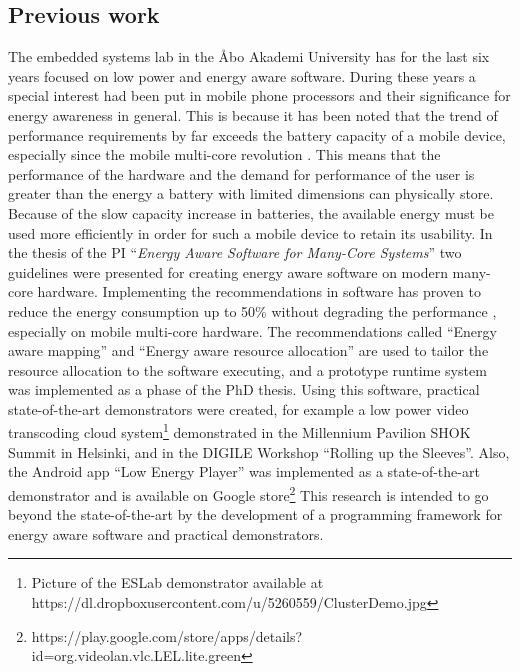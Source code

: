 \documentclass{article}
\begin{document}
\subsection{Previous work}
The embedded systems lab in the \AA{}bo Akademi University has for the last six years focused on low power and energy aware software. 
During these years a special interest had been put in mobile phone processors and their significance for energy awareness in general. 
This is because it has been noted that the trend of performance requirements by far exceeds the battery capacity of a mobile device, especially since the mobile multi-core revolution \cite{BatteryCapacity,CPUCapacity}. 
This means that the performance of the hardware and the demand for performance of the user is greater than the energy a battery with limited dimensions can physically store. 
Because of the slow capacity increase in batteries, the available energy must be used more efficiently in order for such a mobile device to retain its usability.
In the thesis of the PI ``\textit{Energy Aware Software for Many-Core Systems}'' two guidelines were presented for creating energy aware software on modern many-core hardware. 
Implementing the recommendations in software has proven to reduce the energy consumption up to 50\% without degrading the performance \cite{HolmbackaHipeac}, especially on mobile multi-core hardware. 
The recommendations called ``Energy aware mapping'' and ``Energy aware resource allocation'' are used to tailor the resource allocation to the software executing, 
and a prototype runtime system was implemented as a phase of the PhD thesis. 
Using this software, practical state-of-the-art demonstrators were created, for example a low power video transcoding cloud system\footnote{Picture of the ESLab demonstrator available at https://dl.dropboxusercontent.com/u/5260559/ClusterDemo.jpg} demonstrated in the Millennium Pavilion SHOK Summit in Helsinki, and in the DIGILE Workshop ``Rolling up the Sleeves''.
Also, the Android app ``Low Energy Player'' was implemented as a state-of-the-art demonstrator and is available on Google store\footnote{https://play.google.com/store/apps/details?id=org.videolan.vlc.LEL.lite.green}
This research is intended to go beyond the state-of-the-art by the development of a programming framework for energy aware software and practical demonstrators.
\end{document}
